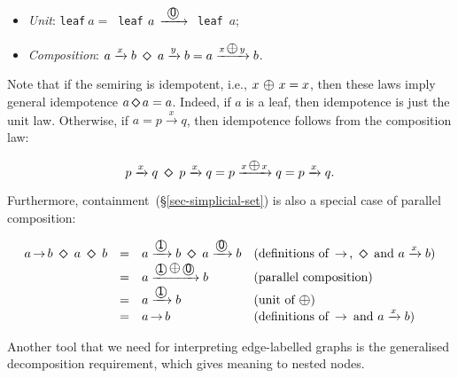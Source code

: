 \documentclass[english,submission]{programming}
\newcommand{\hcode}[1]{{\color{darkblue} \lstinline[keywordstyle={}]|#1|}} %
\newcommand{\add}{\text{\raisebox{-0.1mm}{\large $\oplus$}}}
\newcommand{\zero}{\raisebox{-0.2mm}{\textcircled{\textsf{0}}}\xspace}
\newcommand{\one}{\raisebox{-0.2mm}{\textcircled{\textsf{\hspace{-0.2mm}1}}}\xspace}
\newcommand{\dia}{\,\text{\raisebox{-0.3mm}{\Large $\diamond$}}\,}
\newcommand{\arr}{\,\text{$\rightarrow$}\,}
\begin{document}
\begin{itemize}
    \item \emph{Unit}:
    \hcode{leaf}$~a =~$\hcode{leaf}$~a\,\xrightarrow{\ \zero\ }\ $\hcode{leaf}~$a$;
    \item \emph{Composition}:
    $a \xrightarrow{x} b\ \dia\ a \xrightarrow{y} b = a \xrightarrow{x\,\add\,y} b$.
\end{itemize}

\noindent
Note that if the semiring is idempotent, i.e., $x\ \add\ x = x$, then these laws
imply general idempotence $a \dia a = a$. Indeed, if $a$ is a leaf, then
idempotence is just the unit law. Otherwise, if $a = p \xrightarrow{x} q$, then
idempotence follows from the composition law:

\vspace{-5mm}
\begin{equation*}
p \xrightarrow{x} q\ \dia\ p \xrightarrow{x} q = p \xrightarrow{x\,\add\,x} q
= p \xrightarrow{x} q.
\end{equation*}
\vspace{-5mm}

\noindent
Furthermore, containment~(\S\ref{sec-simplicial-set}) is also a special case of
parallel composition:

\vspace{-5mm}
\begin{equation*}
\begin{array}{rcll}
a \arr b\ \dia\ a\ \dia\ b & = & a \xrightarrow{\one} b\ \dia\ a \xrightarrow{\zero} b & \text{(definitions of $\arr$, $\dia$ and $a \xrightarrow{x} b$)}\\
 & = & a \xrightarrow{\one\,\raisebox{0.15mm}{\add}\,\zero} b & \text{(parallel composition)}\\
 & = & a \xrightarrow{\one} b & \text{(unit of $\add$)}\\
 & = & a \arr b & \text{(definitions of $\arr$ and $a \xrightarrow{x} b$)}
\end{array}
\end{equation*}
\vspace{-3mm}

\noindent
Another tool that we need for interpreting edge-labelled graphs is the
generalised decomposition requirement, which gives meaning to nested nodes.
\end{document}
